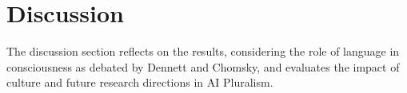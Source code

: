 \section{Discussion}
The discussion section reflects on the results, considering the role of language in consciousness as debated by Dennett and Chomsky, and evaluates the impact of culture and future research directions in AI Pluralism.
